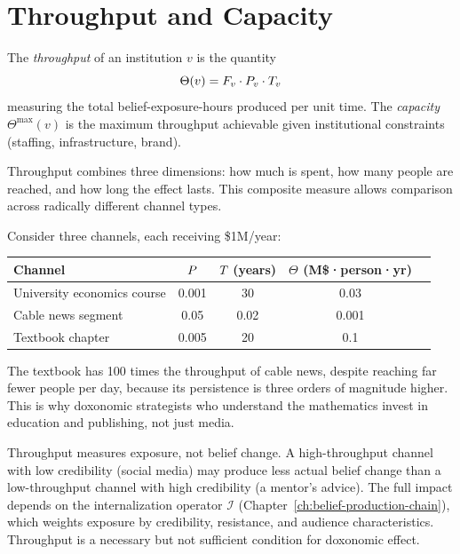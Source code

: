 \section{Throughput and Capacity}
\label{sec:ch7-throughput}

\begin{definition}
\label{def:throughput}
The \emph{throughput} of an institution $v$ is the quantity
\[
  \Theta(v) = F_{v} \cdot P_{v} \cdot T_{v}
\]
measuring the total belief-exposure-hours produced per unit time.
The \emph{capacity} $\Theta^{\max}(v)$ is the maximum throughput achievable given institutional constraints (staffing, infrastructure, brand).
\end{definition}

Throughput combines three dimensions: how much is spent, how many people are reached, and how long the effect lasts.
This composite measure allows comparison across radically different channel types.

\begin{example}
\label{ex:throughput-comparison}
Consider three channels, each receiving \$1M/year:
\begin{center}
\begin{tabular}{lcccc}
\toprule
\textbf{Channel} & $P_{}$ & $T_{}$ (years) & $\Theta$ (M\$·person·yr) \\
\midrule
University economics course & 0.001 & 30 & 0.03 \\
Cable news segment & 0.05 & 0.02 & 0.001 \\
Textbook chapter & 0.005 & 20 & 0.1 \\
\bottomrule
\end{tabular}
\end{center}
The textbook has 100 times the throughput of cable news, despite reaching far fewer people per day, because its persistence is three orders of magnitude higher.
This is why doxonomic strategists who understand the mathematics invest in education and publishing, not just media.
\end{example}

\begin{remark}
\label{rem:throughput-impact}
Throughput measures exposure, not belief change.
A high-throughput channel with low credibility (social media) may produce less actual belief change than a low-throughput channel with high credibility (a mentor's advice).
The full impact depends on the internalization operator $\mathcal{I}$ (Chapter~\ref{ch:belief-production-chain}), which weights exposure by credibility, resistance, and audience characteristics.
Throughput is a necessary but not sufficient condition for doxonomic effect.
\end{remark}


